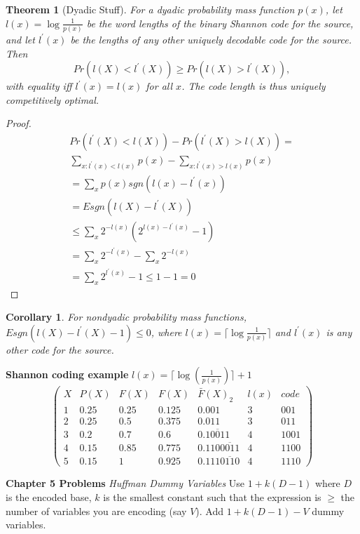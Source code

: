 \documentclass[10pt]{article}
\newtheorem{thm}{Theorem}[section]
\newtheorem{corollary}{Corollary}[section]
\begin{document}
\begin{tiny}
\begin{multicols}{3}
\begin{thm}[Dyadic Stuff] \label{thm: dyadic}
For a dyadic probability mass function $p(x)$, let $l(x) = \log \frac{1}{p(x)}$ be the word lengths of the binary Shannon code for the source, and let $l^{'}(x)$ be the lengths of any other uniquely decodable code for the source. Then 
\[Pr(l(X) < l^{'}(X)) \geq Pr(l(X) > l^{'}(X)),\] 
with equality iff $l^{'}(x) = l(x)$ for all $x$. The code length is thus uniquely competitively optimal.
\end{thm}
\begin{proof}
\begin{eqnarray}
Pr(l^{'}(X) < l(X)) - Pr(l^{'}(X) > l(X)) = \\
\sum_{x:l^{'}(x)<l(x)} p(x) - \sum_{x:l^{'}(x)>l(x)} p(x)\\
=\sum_x p(x)sgn(l(x) - l^{'}(x))\\
=E sgn(l(X) - l^{'}(X)) \\
\leq \sum_x 2^{-l(x)} (2^{l(x)-l^{'}(x)} - 1)\\
=\sum_x 2^{-l^{'}(x)} - \sum_x 2^{-l(x)} \\
=\sum_x 2^{l^{'}(x)} - 1 \leq 1-1 = 0 
\end{eqnarray}
\end{proof}
\begin{corollary}For nondyadic probability mass functions,
$E sgn(l(X) - l^{'}(X) - 1) \leq 0$, where $l(x) = \lceil \log \frac {1}{p(x)} \rceil$ and $l^{'}(x)$ is any other code for the source.
\end{corollary}

\textbf{\scriptsize Shannon coding example}
$l(x)= \lceil \log(\frac{1}{p(x)}) \rceil + 1$
\[
\begin{pmatrix}
      X & P(X) & F(X)  & F(X) & \bar{F}(X)_{2} & l(x) & code  \\
      1 & 0.25 & 0.25 & 0.125 & 0.001 & 3 & 001\\ 
      2 & 0.25 & 0.5 & 0.375 & 0.011 & 3 & 011\\ 
      3 & 0.2 & 0.7 & 0.6 & 0.\overline{10011} & 4 & 1001\\ 
      4 & 0.15 & 0.85 & 0.775 & 0.110 \overline{0011} & 4 & 1100\\ 
      5 & 0.15 & 1 & 0.925 & 0.111\overline{0110} & 4 & 1110
\end{pmatrix}
\]


\textbf{\scriptsize Chapter 5 Problems}
\textit{Huffman Dummy Variables}
Use $1+k(D-1)$ where $D$ is the encoded base, $k$ is the smallest constant such that the expression is $\geq$ the number of variables you are encoding (say $V$). Add $1+k(D-1) - V$ dummy variables.


\end{multicols}
\end{tiny}
\end{document}
